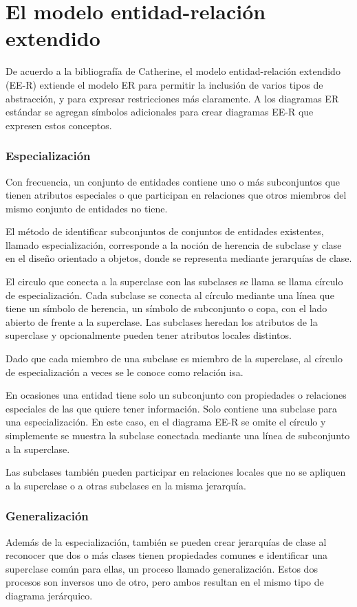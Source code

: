 \section{El modelo entidad-relación extendido}

De acuerdo a la bibliografía de Catherine\cite{catherine_m_ricardo_bases_nodate}, el modelo entidad-relación extendido (EE-R) extiende el modelo ER para permitir la inclusión de varios tipos de abstracción, y para expresar restricciones más claramente. A los diagramas ER estándar se agregan símbolos adicionales para crear diagramas EE-R que expresen estos conceptos.

\subsubsection*{Especialización}
Con frecuencia, un conjunto de entidades contiene uno o más subconjuntos que tienen atributos especiales o que participan en relaciones que otros miembros del mismo conjunto  de entidades no tiene.


El método de identificar subconjuntos de conjuntos de entidades existentes, llamado especialización, corresponde a la noción de herencia de subclase y clase en el diseño orientado a objetos, donde se representa mediante jerarquías de clase.


El circulo que conecta a la superclase con las subclases se llama se llama círculo de especialización.  Cada subclase se conecta al círculo mediante una línea que tiene un símbolo de herencia, un símbolo de subconjunto o copa, con el lado abierto de frente a la superclase. Las subclases heredan los atributos de la superclase y opcionalmente pueden tener atributos locales distintos.


Dado que cada miembro de una subclase es miembro de la superclase, al círculo de especialización a veces se le conoce como relación isa.


En ocasiones una entidad tiene solo un subconjunto con propiedades o relaciones especiales de las que quiere tener información. Solo contiene una subclase para una especialización. En este caso, en el diagrama EE-R se omite el círculo y simplemente se muestra la subclase conectada mediante una línea de subconjunto a la superclase.


Las subclases también pueden participar en relaciones locales que no se apliquen a la superclase o a otras subclases en la misma jerarquía.

\subsubsection*{Generalización}
Además de la especialización, también se pueden crear jerarquías de clase al reconocer que dos o más clases tienen propiedades comunes e identificar una superclase común para ellas, un proceso llamado generalización. Estos dos procesos son inversos uno de otro, pero ambos resultan en el mismo tipo de diagrama jerárquico.


